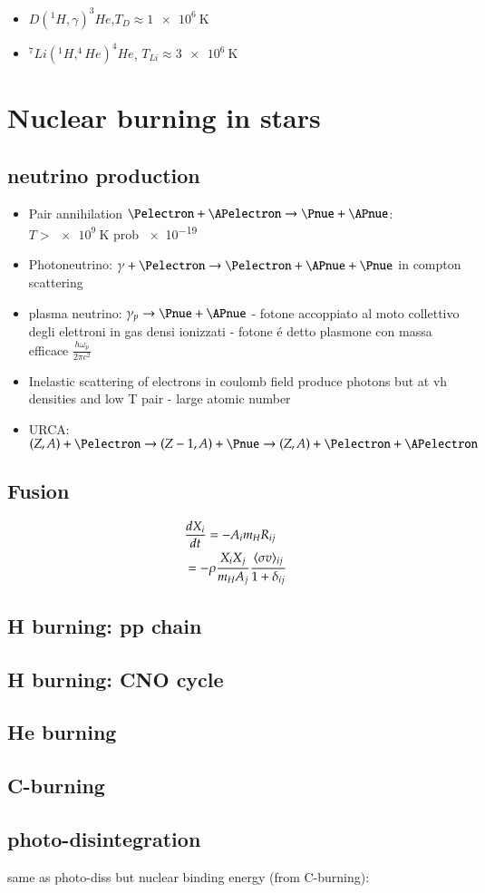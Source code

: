 \documentclass[main.tex]{subfiles}
\begin{document}
\begin{itemize}
\item $D(^1H,\gamma)^3He$,$T_D\approx \SI{1e6}{\kelvin}$
\item $^7Li(^1H,^4He)^4He$, $T_{Li}\approx\SI{3e6}{\kelvin}$ 

\end{itemize}

\chapter{Nuclear burning in stars}

\section{neutrino production}
\begin{itemize}
\item  Pair annihilation $\Pelectron+\APelectron\to\Pnue+\APnue$: $T>\SI{e9}{\kelvin}$ prob \num{e-19}
\item Photoneutrino: $\gamma+\Pelectron\to\Pelectron+\APnue+\Pnue$ in compton scattering
\item plasma neutrino: $\gamma_p\to\Pnue+\APnue$ - fotone accoppiato al moto collettivo degli elettroni in gas densi ionizzati - fotone \'e detto plasmone con massa efficace $\frac{h\omega_p}{2\pi c^2}$
\item Inelastic scattering of electrons in coulomb field produce photons but at vh densities and low T \Pnue\APnue pair - large atomic number
\item URCA: $(Z,A)+\Pelectron\to(Z-1,A)+\Pnue\to(Z,A)+\Pelectron+\APelectron$
\end{itemize}

\section{Fusion}
\begin{align*}
&\TDy{t}{X_i}=-A_im_HR_{ij}\\
&=-\rho\frac{X_iX_j}{m_HA_j}\frac{\exv{\sigma v}_{ij}}{1+\delta_{ij}}
\end{align*} 

\section{H burning: pp chain}

\section{H burning: CNO cycle}

\section{He burning}

\section{C-burning}

\section{photo-disintegration}
same as photo-diss but nuclear binding energy (from C-burning): 
\end{document}
